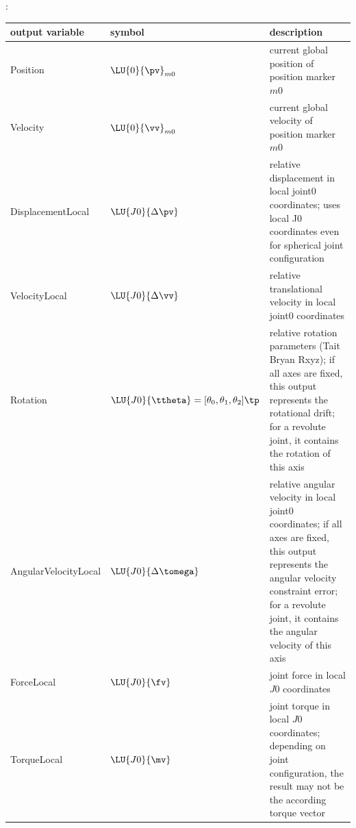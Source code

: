 :
\begin{center}
\footnotesize
\begin{longtable}{| p{5cm} | p{5cm} | p{6cm} |} 
\hline
\bf output variable & \bf symbol & \bf description \\ \hline
Position & $\LU{0}{\pv}_{m0}$ & current global position of position marker $m0$\\ \hline
Velocity & $\LU{0}{\vv}_{m0}$ & current global velocity of position marker $m0$\\ \hline
DisplacementLocal & $\LU{J0}{\Delta\pv}$ & relative displacement in local joint0 coordinates; uses local J0 coordinates even for spherical joint configuration\\ \hline
VelocityLocal & $\LU{J0}{\Delta\vv}$ & relative translational velocity in local joint0 coordinates\\ \hline
Rotation & $\LU{J0}{\ttheta}= [\theta_0,\theta_1,\theta_2]\tp$ & relative rotation parameters (Tait Bryan Rxyz); if all axes are fixed, this output represents the rotational drift; for a revolute joint, it contains the rotation of this axis\\ \hline
AngularVelocityLocal & $\LU{J0}{\Delta\tomega}$ & relative angular velocity in local joint0 coordinates; if all axes are fixed, this output represents the angular velocity constraint error; for a revolute joint, it contains the angular velocity of this axis\\ \hline
ForceLocal & $\LU{J0}{\fv}$ & joint force in local $J0$ coordinates\\ \hline
TorqueLocal & $\LU{J0}{\mv}$ & joint torque in local $J0$ coordinates; depending on joint configuration, the result may not be the according torque vector\\ \hline
\end{longtable}
\end{center}
 \noindent
